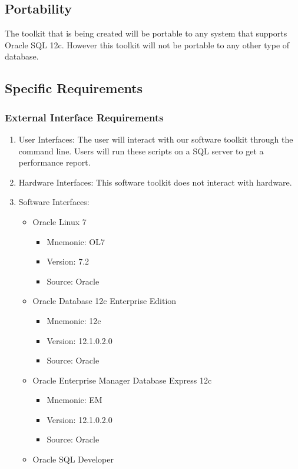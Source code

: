 \documentclass[draftclsnofoot, onecolumn, compsoc, 10pt]{IEEEtran}
\begin{document}
\subsection{Portability}
The toolkit that is being created will be portable to any system that supports Oracle SQL 12c.
However this toolkit will not be portable to any other type of database.  

\subsection{Specific Requirements}

\subsubsection{External Interface Requirements}
\begin{enumerate}
	\item User Interfaces: The user will interact with our software toolkit through the command line.
    	  Users will run these scripts on a SQL server to get a performance report.
     \item Hardware Interfaces: This software toolkit does not interact with hardware.
     \item Software Interfaces:
     \begin{itemize}
	 \item Oracle Linux 7
	 \begin{itemize}
		\item Mnemonic: OL7
		\item Version: 7.2
        \item Source: Oracle
	 \end{itemize}
	 \item Oracle Database 12c Enterprise Edition
	 \begin{itemize}
		\item Mnemonic: 12c
        \item Version: 12.1.0.2.0
        \item Source: Oracle
	 \end{itemize}
     \item Oracle Enterprise Manager Database Express 12c
	 \begin{itemize}
		\item Mnemonic: EM
        \item Version: 12.1.0.2.0
        \item Source: Oracle
	 \end{itemize}
     \item Oracle SQL Developer

\end{itemize}
\end{enumerate}
\end{document}
